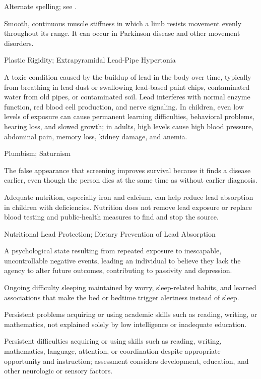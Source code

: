  Alternate spelling; see .

 Smooth, continuous muscle stiffness in which a limb resists movement evenly throughout its range. It can occur in Parkinson disease and other movement disorders.

\synonyms
Plastic Rigidity; Extrapyramidal Lead-Pipe Hypertonia

 A toxic condition caused by the buildup of lead in the body over time, typically from breathing in lead dust or swallowing lead-based paint chips, contaminated water from old pipes, or contaminated soil. Lead interferes with normal enzyme function, red blood cell production, and nerve signaling. In children, even low levels of exposure can cause permanent learning difficulties, behavioral problems, hearing loss, and slowed growth; in adults, high levels cause high blood pressure, abdominal pain, memory loss, kidney damage, and anemia.

\synonyms
Plumbism; Saturnism

 The false appearance that screening improves survival because it finds a disease earlier, even though the person dies at the same time as without earlier diagnosis.

 Adequate nutrition, especially iron and calcium, can help reduce lead absorption in children with deficiencies. Nutrition does not remove lead exposure or replace blood testing and public-health measures to find and stop the source.

\synonyms
Nutritional Lead Protection; Dietary Prevention of Lead Absorption

 A psychological state resulting from repeated exposure to inescapable, uncontrollable negative events, leading an individual to believe they lack the agency to alter future outcomes, contributing to passivity and depression.

 Ongoing difficulty sleeping maintained by worry, sleep-related habits, and learned associations that make the bed or bedtime trigger alertness instead of sleep.

 Persistent problems acquiring or using academic skills such as reading, writing, or mathematics, not explained solely by low intelligence or inadequate education.

 Persistent difficulties acquiring or using skills such as reading, writing, mathematics, language, attention, or coordination despite appropriate opportunity and instruction; assessment considers development, education, and other neurologic or sensory factors.

